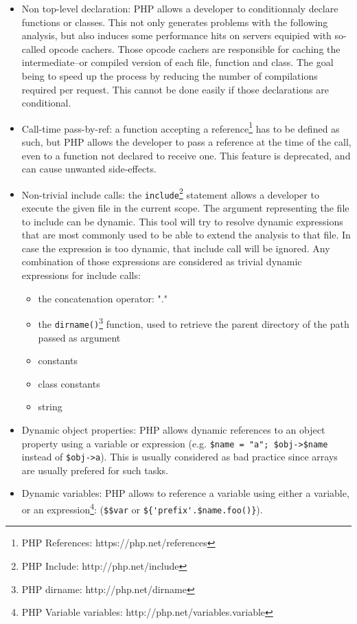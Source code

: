 \documentclass[a4paper]{article}
\begin{document}
\begin{itemize}
  \item Non top-level declaration: PHP allows a developer to conditionnaly
    declare functions or classes. This not only generates problems with the
    following analysis, but also induces some performance hits on servers equipied
    with so-called opcode cachers. Those opcode cachers are responsible for caching
    the intermediate--or compiled version of each file, function and class. The
    goal being to speed up the process by reducing the number of compilations
    required per request. This cannot be done easily if those declarations are
    conditional.
  \item Call-time pass-by-ref: a function accepting a reference\footnote{PHP
    References: https://php.net/references} has to be defined as such, but PHP
    allows the developer to pass a reference at the time of the call, even to a
    function not declared to receive one. This feature is deprecated, and can cause
    unwanted side-effects.
  \item Non-trivial include calls: the \verb=include=\footnote{PHP Include:
    http://php.net/include} statement allows a developer to execute the given file
    in the current scope. The argument representing the file to include can be
    dynamic. This tool will try to resolve dynamic expressions that are most
    commonly used to be able to extend the analysis to that file. In case the
    expression is too dynamic, that include call will be ignored. Any
    combination of those expressions are considered as trivial dynamic expressions
    for include calls:
    \begin{itemize}
      \item the concatenation operator: "."
      \item the \verb=dirname()=\footnote{PHP dirname: http://php.net/dirname} function,
          used to retrieve the parent directory of the path passed as argument
      \item constants
      \item class constants
      \item string
    \end{itemize}
  \item Dynamic object properties: PHP allows dynamic references to an object property
    using a variable or expression (e.g. \verb.$name = "a"; $obj->$name. instead of
    \verb.$obj->a.). This is usually considered as bad practice since arrays are
    usually prefered for such tasks.
  \item Dynamic variables: PHP allows to reference a variable using either a
    variable, or an expression\footnote{PHP Variable variables:
    http://php.net/variables.variable}: (\verb=$$var= or
    \verb=${'prefix'.$name.foo()}=).
\end{itemize}
\end{document}

